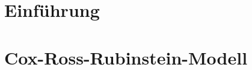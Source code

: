 \documentclass[ngerman, a4paper, 11pt]{report}
\institute{Stochastik}
\begin{document}
\makeTUtitle
    
\tableofcontents

\chapter{Einführung}
\label{chapter_1_einfuehrung}






\chapter{Cox-Ross-Rubinstein-Modell}
\label{chapter_2_crr}



\end{document}
